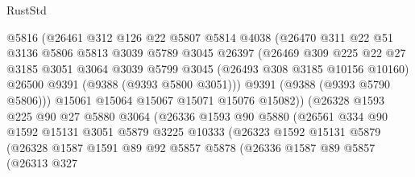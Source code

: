 \begin{lexlean}{RustStd}
\begin{coremodule}
                      @5816
                      (@26461
                        @312
                        @126
                        @22
                        @5807
                        @5814
                        @4038
                        (@26470
                          @311
                          @22
                          @51
                          @3136
                          @5806
                          @5813
                          @3039
                          @5789
                          @3045
                          @26397
                          (@26469
                            @309
                            @225
                            @22
                            @27
                            @3185
                            @3051
                            @3064
                            @3039
                            @5799
                            @3045
                            (@26493 @308 @3185 @10156 @10160)
                            @26500
                            @9391
                            (@9388 (@9393 @5800 @3051)))
                          @9391
                          (@9388 (@9393 @5790 @5806)))
                        @15061
                        @15064
                        @15067
                        @15071
                        @15076
                        @15082))
                    (@26328
                      @1593
                      @225
                      @90
                      @27
                      @5880
                      @3064
                      (@26336
                        @1593
                        @90
                        @5880
                        (@26561
                          @334
                          @90
                          @1592
                          @15131
                          @3051
                          @5879
                          @3225
                          @10333
                          (@26323
                            @1592
                            @15131
                            @5879
                            (@26328
                              @1587
                              @1591
                              @89
                              @92
                              @5857
                              @5878
                              (@26336
                                @1587
                                @89
                                @5857
                                (@26313
                                  @327

\end{coremodule}
\end{lexlean}
